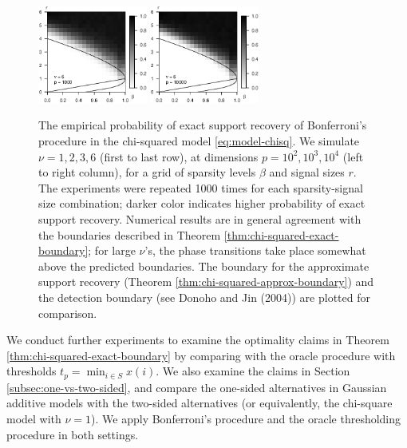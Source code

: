 \begin{figure}
      \includegraphics[width=0.32\textwidth]{sim_strong_boundary/simulated_phase_diagram_chi-squared_nu6_p1000.eps}
      \includegraphics[width=0.32\textwidth]{sim_strong_boundary/simulated_phase_diagram_chi-squared_nu6_p10000.eps}
      \caption{The empirical probability of exact support recovery of Bonferroni's procedure in the chi-squared model \eqref{eq:model-chisq}. 
      We simulate $\nu=1, 2, 3, 6$ (first to last row), at dimensions $p=10^2, 10^3, 10^4$ (left to right column), for a grid of sparsity levels $\beta$ and signal sizes $r$.
      The experiments were repeated 1000 times for each sparsity-signal size combination; darker color indicates higher probability of exact support recovery.  
      Numerical results are in general agreement with the boundaries described in Theorem \ref{thm:chi-squared-exact-boundary}; for large $\nu$'s, the phase transitions take place somewhat above the predicted boundaries.
      The boundary for the approximate support recovery (Theorem \ref{thm:chi-squared-approx-boundary}) and the detection boundary (see Donoho and Jin (2004)) are plotted for comparison.} 
      \label{fig:phase-simulated-chi-squared}
\end{figure}

We conduct further experiments to examine the optimality claims in Theorem \ref{thm:chi-squared-exact-boundary} by comparing with the oracle procedure with thresholds $t_p=\min_{i\in S}x(i)$.
We also examine the claims in Section \ref{subsec:one-vs-two-sided}, and compare the one-sided alternatives in Gaussian additive models with the two-sided alternatives (or equivalently, the chi-square model with $\nu=1$).
We apply Bonferroni's procedure and the oracle thresholding procedure in both settings.

